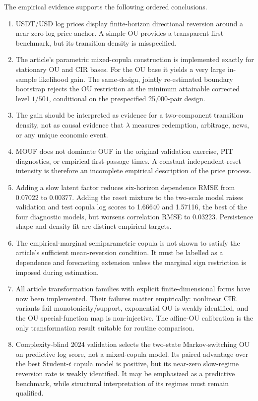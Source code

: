 \documentclass[11pt]{article}
\newcommand{\1}{\mathbf{1}}
\begin{document}
The empirical evidence supports the following ordered conclusions.
\begin{enumerate}
\item USDT/USD log prices display finite-horizon directional reversion around a
near-zero log-price anchor.  A simple OU provides a transparent first benchmark,
but its transition density is misspecified.
\item The article's parametric mixed-copula construction is implemented exactly
for stationary OU and CIR bases.  For the OU base it yields a very large
in-sample likelihood gain.  The same-design, jointly re-estimated boundary
bootstrap rejects the OU restriction at the minimum attainable corrected level
$1/501$, conditional on the prespecified 25,000-pair design.
\item The gain should be interpreted as evidence for a two-component transition
density, not as causal evidence that $\lambda$ measures redemption, arbitrage,
news, or any unique economic event.
\item MOUF does not dominate OUF in the original validation exercise, PIT
diagnostics, or empirical first-passage times.  A constant independent-reset
intensity is therefore an incomplete empirical description of the price process.
\item Adding a slow latent factor reduces six-horizon dependence RMSE from 0.07022
to 0.00377.  Adding the reset mixture to the two-scale model raises validation and
test copula log scores to 1.66640 and 1.57116, the best of the four diagnostic
models, but worsens correlation RMSE to 0.03223.  Persistence shape and density
fit are distinct empirical targets.
\item The empirical-marginal semiparametric copula is not shown to satisfy the
article's sufficient mean-reversion condition.  It must be labelled as a
dependence and forecasting extension unless the marginal sign restriction is
imposed during estimation.
\item All article transformation families with explicit finite-dimensional
forms have now been implemented.  Their failures matter empirically: nonlinear
CIR variants fail monotonicity/support, exponential OU is weakly identified,
and the OU special-function map is non-injective.  The affine-OU calibration is
the only transformation result suitable for routine comparison.
\item Complexity-blind 2024 validation selects the two-state Markov-switching OU
on predictive log score, not a mixed-copula model.  Its paired advantage over the
best Student-$t$ copula model is positive, but its near-zero slow-regime reversion
rate is weakly identified.  It may be emphasized as a predictive benchmark,
while structural interpretation of its regimes must remain qualified.
\end{enumerate}
\end{document}
